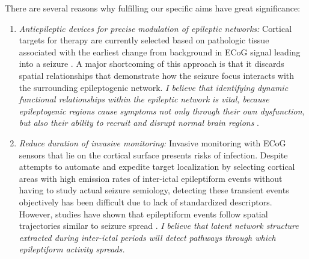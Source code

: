 There are several reasons why fulfilling our specific aims have great significance:
\begin{enumerate}
    \item \textit{Antiepileptic devices for precise modulation of epileptic networks:} Cortical targets for therapy are currently selected based on pathologic tissue associated with the earliest change from background in ECoG signal leading into a seizure \cite{litt2001epileptic}. A major shortcoming of this approach is that it discards spatial relationships that demonstrate how the seizure focus interacts with the surrounding epileptogenic network. \textit{I believe that identifying dynamic functional relationships within the epileptic network is vital, because epileptogenic regions cause symptoms not only through their own dysfunction, but also their ability to recruit and disrupt normal brain regions} \cite{kutsy1999ictal, spencer2002neural}.
    
    \item \textit{Reduce duration of invasive monitoring:} Invasive monitoring with ECoG sensors that lie on the cortical surface presents risks of infection. Despite attempts to automate and expedite target localization by selecting cortical areas with high emission rates of inter-ictal epileptiform events without having to study actual seizure semiology, detecting these transient events objectively has been difficult due to lack of standardized descriptors. However, studies have shown that epileptiform events follow spatial trajectories similar to seizure spread \cite{alarcon1997origin, lai2007cortical, wilke2009identification}. \textit{I believe that latent network structure extracted during inter-ictal periods will detect pathways through which epileptiform activity spreads.}
\end{enumerate}
